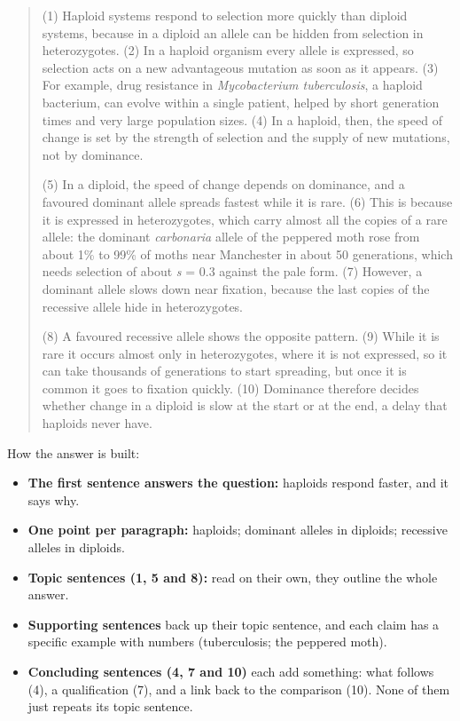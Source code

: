 \documentclass[
  a4paper]{book}
\providecommand{\tightlist}{%
  \setlength{\itemsep}{0pt}\setlength{\parskip}{0pt}}
\begin{document}
\begin{quote}
(1) Haploid systems respond to selection more quickly than diploid systems, because in a diploid an allele can be hidden from selection in heterozygotes. (2) In a haploid organism every allele is expressed, so selection acts on a new advantageous mutation as soon as it appears. (3) For example, drug resistance in \emph{Mycobacterium tuberculosis}, a haploid bacterium, can evolve within a single patient, helped by short generation times and very large population sizes. (4) In a haploid, then, the speed of change is set by the strength of selection and the supply of new mutations, not by dominance.

(5) In a diploid, the speed of change depends on dominance, and a favoured dominant allele spreads fastest while it is rare. (6) This is because it is expressed in heterozygotes, which carry almost all the copies of a rare allele: the dominant \emph{carbonaria} allele of the peppered moth rose from about 1\% to 99\% of moths near Manchester in about 50 generations, which needs selection of about \emph{s} = 0.3 against the pale form. (7) However, a dominant allele slows down near fixation, because the last copies of the recessive allele hide in heterozygotes.

(8) A favoured recessive allele shows the opposite pattern. (9) While it is rare it occurs almost only in heterozygotes, where it is not expressed, so it can take thousands of generations to start spreading, but once it is common it goes to fixation quickly. (10) Dominance therefore decides whether change in a diploid is slow at the start or at the end, a delay that haploids never have.
\end{quote}

How the answer is built:

\begin{itemize}
\tightlist
\item
  \textbf{The first sentence answers the question:} haploids respond faster, and it says why.
\item
  \textbf{One point per paragraph:} haploids; dominant alleles in diploids; recessive alleles in diploids.
\item
  \textbf{Topic sentences (1, 5 and 8):} read on their own, they outline the whole answer.
\item
  \textbf{Supporting sentences} back up their topic sentence, and each claim has a specific example with numbers (tuberculosis; the peppered moth).
\item
  \textbf{Concluding sentences (4, 7 and 10)} each add something: what follows (4), a qualification (7), and a link back to the comparison (10). None of them just repeats its topic sentence.
\end{itemize}
\end{document}
